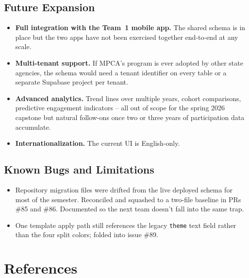 \documentclass[11pt,letterpaper]{article}
\begin{document}
\subsection{Future Expansion}

\begin{itemize}
  \item \textbf{Full integration with the Team~1 mobile app.} The
        shared schema is in place but the two apps have not been
        exercised together end-to-end at any scale.
  \item \textbf{Multi-tenant support.} If MPCA's program is ever
        adopted by other state agencies, the schema would need a
        tenant identifier on every table or a separate Supabase
        project per tenant.
  \item \textbf{Advanced analytics.} Trend lines over multiple
        years, cohort comparisons, predictive engagement
        indicators -- all out of scope for the spring 2026
        capstone but natural follow-ons once two or three
        years of participation data accumulate.
  \item \textbf{Internationalization.} The current UI is
        English-only.
\end{itemize}

\subsection{Known Bugs and Limitations}

\begin{itemize}
  \item Repository migration files were drifted from the live
        deployed schema for most of the semester. Reconciled and
        squashed to a two-file baseline in PRs \#85 and \#86.
        Documented so the next team doesn't fall into the same trap.
  \item One template apply path still references the legacy
        \texttt{theme} text field rather than the four split
        colors; folded into issue \#89.
\end{itemize}

\newpage

\section*{References}
\end{document}
